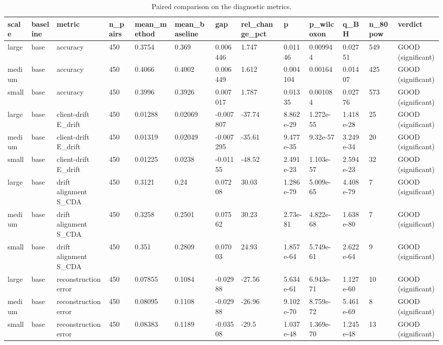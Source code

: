 \begin{table}[t]\centering\footnotesize
\caption{Paired comparison on the diagnostic metrics.}\label{tab:table13_diagnostics}
\begin{tabular}{lllllllllllll}
\toprule
scale & baseline & metric & n\_pairs & mean\_method & mean\_baseline & gap & rel\_change\_pct & p & p\_wilcoxon & q\_BH & n\_80pow & verdict \\
\midrule
large & base & accuracy & 450 & 0.3754 & 0.369 & 0.006446 & 1.747 & 0.01146 & 0.009944 & 0.02751 & 549 & GOOD (significant) \\
medium & base & accuracy & 450 & 0.4066 & 0.4002 & 0.006449 & 1.612 & 0.004104 & 0.00164 & 0.01407 & 425 & GOOD (significant) \\
small & base & accuracy & 450 & 0.3996 & 0.3926 & 0.007017 & 1.787 & 0.01335 & 0.001084 & 0.02776 & 573 & GOOD (significant) \\
large & base & client-drift E\_drift & 450 & 0.01288 & 0.02069 & -0.007807 & -37.74 & 8.862e-29 & 1.272e-55 & 1.418e-28 & 25 & GOOD (significant) \\
medium & base & client-drift E\_drift & 450 & 0.01319 & 0.02049 & -0.007295 & -35.61 & 9.477e-35 & 9.32e-57 & 3.249e-34 & 20 & GOOD (significant) \\
small & base & client-drift E\_drift & 450 & 0.01225 & 0.0238 & -0.01155 & -48.52 & 2.491e-23 & 1.103e-57 & 2.594e-23 & 32 & GOOD (significant) \\
large & base & drift alignment S\_CDA & 450 & 0.3121 & 0.24 & 0.07208 & 30.03 & 1.286e-79 & 5.009e-65 & 4.408e-79 & 7 & GOOD (significant) \\
medium & base & drift alignment S\_CDA & 450 & 0.3258 & 0.2501 & 0.07562 & 30.23 & 2.73e-81 & 4.822e-68 & 1.638e-80 & 7 & GOOD (significant) \\
small & base & drift alignment S\_CDA & 450 & 0.351 & 0.2809 & 0.07003 & 24.93 & 1.857e-64 & 5.749e-61 & 2.622e-64 & 9 & GOOD (significant) \\
large & base & reconstruction error & 450 & 0.07855 & 0.1084 & -0.02988 & -27.56 & 5.634e-61 & 6.943e-71 & 1.127e-60 & 10 & GOOD (significant) \\
medium & base & reconstruction error & 450 & 0.08095 & 0.1108 & -0.02988 & -26.96 & 9.102e-70 & 8.759e-72 & 5.461e-69 & 8 & GOOD (significant) \\
small & base & reconstruction error & 450 & 0.08383 & 0.1189 & -0.03508 & -29.5 & 1.037e-48 & 1.369e-70 & 1.245e-48 & 13 & GOOD (significant) \\

\end{tabular}
\end{table}
